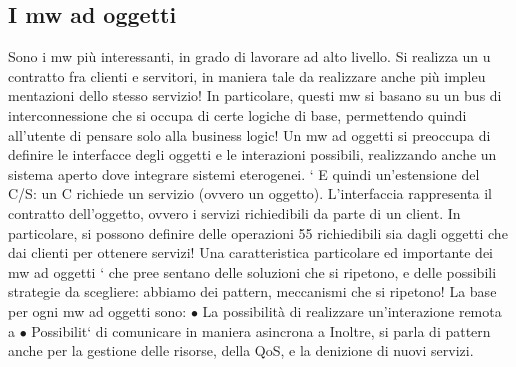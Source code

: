 \documentclass[a4paper,12pt]{article}
\begin{document}
\subsection{I mw ad oggetti}
Sono i mw più interessanti, in grado di lavorare ad alto livello. Si realizza un
u
contratto fra clienti e servitori, in maniera tale da realizzare anche più impleu
mentazioni dello stesso servizio! In particolare, questi mw si basano su un bus
di interconnessione che si occupa di certe logiche di base, permettendo quindi
all'utente di pensare solo alla business logic! Un mw ad oggetti si preoccupa di
definire le interfacce degli oggetti e le interazioni possibili, realizzando anche un
sistema aperto dove integrare sistemi eterogenei.
`
E quindi un'estensione del C/S: un C richiede un servizio (ovvero un oggetto). L'interfaccia rappresenta il contratto
dell'oggetto, ovvero i servizi richiedibili da parte di un client. In particolare, si possono definire delle operazioni
55
richiedibili sia dagli oggetti che dai clienti per ottenere servizi!
Una caratteristica particolare ed importante dei mw ad oggetti ` che pree
sentano delle soluzioni che si ripetono, e delle possibili strategie da scegliere:
abbiamo dei pattern, meccanismi che si ripetono!
La base per ogni mw ad oggetti sono:
$\bullet$ La possibilità di realizzare un'interazione remota
a
$\bullet$ Possibilit` di comunicare in maniera asincrona
a
Inoltre, si parla di pattern anche per la gestione delle risorse, della QoS, e la
denizione di nuovi servizi.
\end{document}
